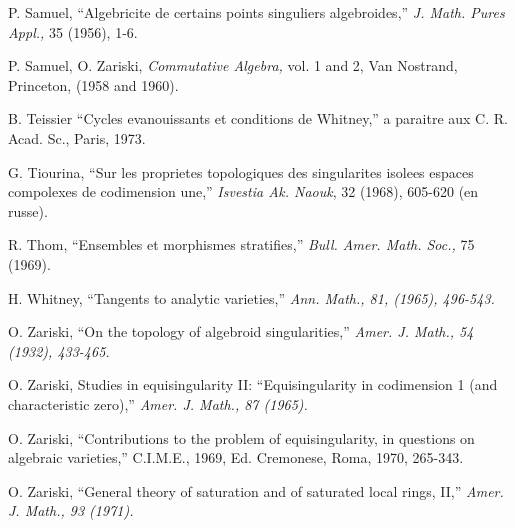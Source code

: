 \begin{thebibliography}{99}
 P. Samuel, ``Algebricite de certains points singuliers algebroides,'' {\em J. Math. Pures Appl.,} 35 (1956), 1-6.

 P. Samuel, O. Zariski, {\em Commutative Algebra,} vol. 1 and 2, Van Nostrand, Princeton, (1958 and 1960).

 B. Teissier ``Cycles evanouissants et conditions de Whitney,'' a paraitre aux C. R. Acad. Sc., Paris, 1973.

 G. Tiourina, ``Sur les proprietes topologiques des singularites isolees espaces compolexes de codimension une,'' {\em Isvestia Ak. Naouk}, 32 (1968), 605-620 (en russe).

 R. Thom, ``Ensembles et morphismes stratifies,'' {\em Bull. Amer. Math. Soc.,} 75 (1969).

 H. Whitney, ``Tangents to analytic varieties,'' {\em Ann. Math., 81, (1965), 496-543.}

 O. Zariski, ``On the topology of algebroid singularities,''  {\em Amer. J. Math., 54 (1932), 433-465.}

 O. Zariski, Studies in equisingularity II: ``Equisingularity in codimension 1 (and characteristic zero),'' {\em Amer. J. Math., 87 (1965).}

 O. Zariski, ``Contributions to the problem of equisingularity, in questions on algebraic varieties,'' C.I.M.E., 1969, Ed. Cremonese, Roma, 1970, 265-343.

 O. Zariski, ``General theory of saturation and of saturated local rings, II,'' {\em Amer. J. Math., 93 (1971).}

\end{thebibliography}
